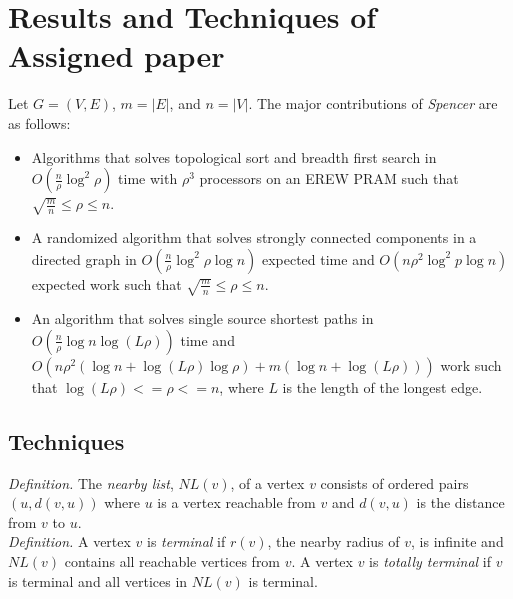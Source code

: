 \documentclass[paper=a4, fontsize=11pt]{scrartcl} %
\numberwithin{equation}{section} %
\numberwithin{figure}{section} %
\numberwithin{table}{section} %
\begin{document}

\section{Results and Techniques of Assigned paper}

Let $G = (V,E)$, $m = |E|$, and $n = |V|$. The major contributions of \textit{Spencer\cite{S97}} are as follows:

\begin{itemize}
\item Algorithms that solves topological sort and breadth first search in $O(\frac{n}{\rho}\log^2{\rho})$ time with $\rho^3$ processors on an EREW PRAM such that $ \sqrt{\frac{m}{n}} \leq \rho \leq n$.
\item A randomized algorithm that solves strongly connected components in a directed graph in $O(\frac{n}{\rho}\log^2{\rho}\log{n})$ expected time and $O(n\rho^2\log^2{p}\log{n})$ expected work such that $ \sqrt{\frac{m}{n}} \leq \rho \leq n$.
\item An algorithm that solves single source shortest paths in $O(\frac{n}{\rho}\log{n}\log{(L\rho)})$ time and $O(n\rho^2(\log{n} + \log{(L\rho)}\log{\rho}) + m(\log{n} + \log{(L\rho)}))$ work such that $\log{(L\rho)} <= \rho <= n$, where $L$ is the length of the longest edge.
\end{itemize}

\subsection{Techniques}
\hfill

\textit{Definition.} The \textit{nearby list}, $NL(v)$, of a vertex $v$ consists of ordered pairs $(u, d(v,u))$ where $u$ is a vertex reachable from $v$ and $d(v,u)$ is the distance from $v$ to $u$.\\

\textit{Definition.} A vertex $v$ is \textit{terminal} if $r(v)$, the nearby radius of $v$, is infinite and $NL(v)$ contains all reachable vertices from $v$. A vertex $v$ is \textit{totally terminal} if $v$ is terminal and all vertices in $NL(v)$ is terminal.\\
\end{document}
